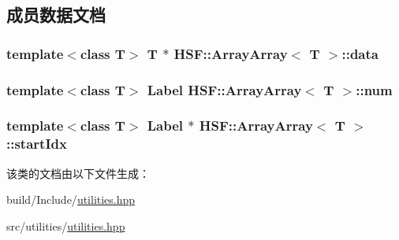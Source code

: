 \subsection{成员数据文档}
\hypertarget{classHSF_1_1ArrayArray_a524244f009113389481a559bd9b26136}{
\subsubsection[{data}]{\setlength{\rightskip}{0pt plus 5cm}template$<$class T$>$ T $\ast$ {\bf HSF::ArrayArray}$<$ T $>$::{\bf data}}}
\label{classHSF_1_1ArrayArray_a524244f009113389481a559bd9b26136}
\hypertarget{classHSF_1_1ArrayArray_adff8dc1a354edb255279c6b2599b00ae}{
\subsubsection[{num}]{\setlength{\rightskip}{0pt plus 5cm}template$<$class T$>$ {\bf Label} {\bf HSF::ArrayArray}$<$ T $>$::{\bf num}}}
\label{classHSF_1_1ArrayArray_adff8dc1a354edb255279c6b2599b00ae}
\hypertarget{classHSF_1_1ArrayArray_acdc48259fcdc868c60343a60392b6089}{
\subsubsection[{startIdx}]{\setlength{\rightskip}{0pt plus 5cm}template$<$class T$>$ {\bf Label} $\ast$ {\bf HSF::ArrayArray}$<$ T $>$::{\bf startIdx}}}
\label{classHSF_1_1ArrayArray_acdc48259fcdc868c60343a60392b6089}


该类的文档由以下文件生成：\begin{DoxyCompactItemize}
\item 
build/Include/\hyperlink{build_2Include_2utilities_8hpp}{utilities.hpp}\item 
src/utilities/\hyperlink{src_2utilities_2utilities_8hpp}{utilities.hpp}\end{DoxyCompactItemize}
